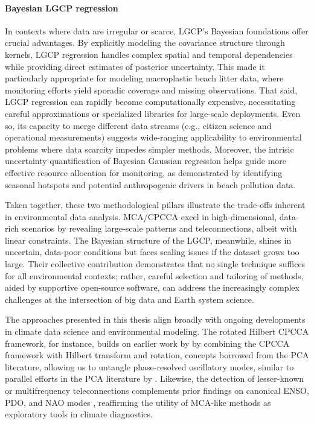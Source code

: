 \paragraph{Bayesian LGCP regression}
In contexts where data are irregular or scarce, LGCP's Bayesian foundations offer crucial advantages. By explicitly modeling the covariance structure through kernels, LGCP regression handles complex spatial and temporal dependencies while providing direct estimates of posterior uncertainty. This made it particularly appropriate for modeling macroplastic beach litter data, where monitoring efforts yield sporadic coverage and missing observations. That said, LGCP regression can rapidly become computationally expensive, necessitating careful approximations or specialized libraries for large-scale deployments. Even so, its capacity to merge different data streams (e.g., citizen science and operational measurements) suggests wide-ranging applicability to environmental problems where data scarcity impedes simpler methods. Moreover, the intrisic uncertainty quantification of Bayesian Gaussian regression helps guide more effective resource allocation for monitoring, as demonstrated by identifying seasonal hotspots and potential anthropogenic drivers in beach pollution data.

Taken together, these two methodological pillars illustrate the trade-offs inherent in environmental data analysis. MCA/CPCCA excel in high-dimensional, data-rich scenarios by revealing large-scale patterns and teleconnections, albeit with linear constraints. The Bayesian structure of the LGCP, meanwhile, shines in uncertain, data-poor conditions but faces scaling issues if the dataset grows too large. Their collective contribution demonstrates that no single technique suffices for all environmental contexts; rather, careful selection and tailoring of methods, aided by supportive open-source software, can address the increasingly complex challenges at the intersection of big data and Earth system science.


The approaches presented in this thesis align broadly with ongoing developments in climate data science and environmental modeling. The rotated Hilbert CPCCA framework, for instance, builds on earlier work by \citet{swenson_continuum_2015} by combining the CPCCA framework with Hilbert transform and rotation, concepts borrowed from the PCA literature, allowing us to untangle phase-resolved oscillatory modes, similar to parallel efforts in the PCA literature by \citet[e.g.][]{bueso_nonlinear_2020,guilloteau_rotated_2020}.  Likewise, the detection of lesser-known or multifrequency teleconnections complements prior findings on canonical ENSO, PDO, and NAO modes \cite[e.g.][]{timmermann_ninosouthern_2018, mezzina_dynamics_2020,wiedermann_differential_2021,tang_positive_2024}, reaffirming the utility of MCA-like methods as exploratory tools in climate diagnostics.

